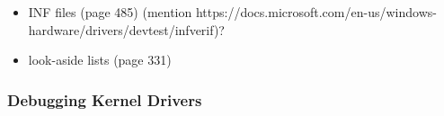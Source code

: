 \begin{itemize}
	\item INF files (page 485) (mention https://docs.microsoft.com/en-us/windows-hardware/drivers/devtest/infverif)?
	\item look-aside lists (page 331)
\end{itemize}

\subsubsection{Debugging Kernel Drivers}
\label{chap:background.kerneldriver.debugging}

